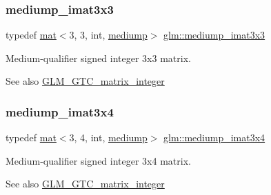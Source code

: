 \subsubsection{\texorpdfstring{mediump\+\_\+imat3x3}{mediump\_imat3x3}}
{\footnotesize\ttfamily typedef \mbox{\hyperlink{structglm_1_1mat}{mat}}$<$3, 3, int, \mbox{\hyperlink{namespaceglm_a36ed105b07c7746804d7fdc7cc90ff25a6416f3ea0c9025fb21ed50c4d6620482}{mediump}}$>$ \mbox{\hyperlink{group__gtc__matrix__integer_ga1304a2da9c3f5937aa8c4684d638d09c}{glm\+::mediump\+\_\+imat3x3}}}

Medium-\/qualifier signed integer 3x3 matrix. \begin{DoxySeeAlso}{See also}
\mbox{\hyperlink{group__gtc__matrix__integer}{G\+L\+M\+\_\+\+G\+T\+C\+\_\+matrix\+\_\+integer}} 
\end{DoxySeeAlso}
\mbox{\label{group__gtc__matrix__integer_gae0ab87609ac842f31be9e581caafa0f0}} 
\subsubsection{\texorpdfstring{mediump\+\_\+imat3x4}{mediump\_imat3x4}}
{\footnotesize\ttfamily typedef \mbox{\hyperlink{structglm_1_1mat}{mat}}$<$3, 4, int, \mbox{\hyperlink{namespaceglm_a36ed105b07c7746804d7fdc7cc90ff25a6416f3ea0c9025fb21ed50c4d6620482}{mediump}}$>$ \mbox{\hyperlink{group__gtc__matrix__integer_gae0ab87609ac842f31be9e581caafa0f0}{glm\+::mediump\+\_\+imat3x4}}}

Medium-\/qualifier signed integer 3x4 matrix. \begin{DoxySeeAlso}{See also}
\mbox{\hyperlink{group__gtc__matrix__integer}{G\+L\+M\+\_\+\+G\+T\+C\+\_\+matrix\+\_\+integer}} 
\end{DoxySeeAlso}
\mbox{\label{group__gtc__matrix__integer_ga3ce415f7039ec7f1ad5bffa14d226e80}} 
